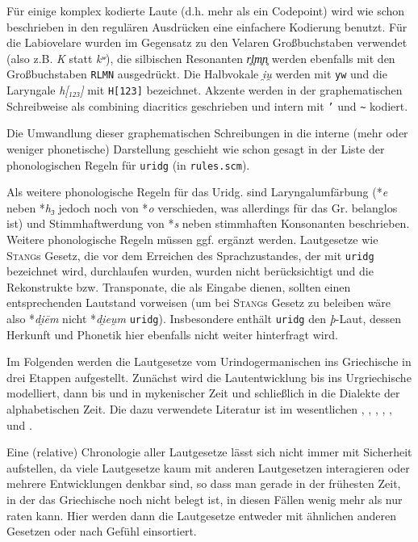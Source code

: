 \documentclass[12pt,a4paper,normalheadings]{scrartcl}
\def\rek#1{\mbox{*\textit{#1}}}
\def\bel#1{\mbox{\textit{#1}}}
\def\tt#1{\texttt{#1}}
\begin{document}
Für einige komplex kodierte Laute (d.h. mehr als ein Codepoint)
wird wie schon beschrieben in den regulären Ausdrücken eine einfachere
Kodierung benutzt.
Für die Labiovelare wurden im Gegensatz zu den Velaren Großbuchstaben verwendet
(also z.B. \bel{K} statt \bel{kʷ}),
die silbischen Resonanten \bel{r̥l̥m̥n̥} werden ebenfalls
mit den Großbuchstaben \tt{RLMN} ausgedrückt.
Die Halbvokale \bel{i̯u̯} werden mit \tt{yw} und
die Laryngale \bel{h[₁₂₃]} mit \tt{H[123]} bezeichnet.
Akzente werden in der graphematischen Schreibweise
als combining diacritics geschrieben und intern mit \tt{'} und \tt{\textasciitilde}
kodiert.

Die Umwandlung dieser graphematischen Schreibungen in die interne
(mehr oder weniger phonetische) Darstellung geschieht wie schon
gesagt in der Liste der
phonologischen Regeln für \tt{uridg} (in \tt{rules.scm}).

Als weitere phonologische Regeln für das Uridg.
sind Laryngalumfärbung (\rek{e} neben \rek{h₃} jedoch noch von \rek{o}
verschieden, was allerdings für das Gr. belanglos ist)
und Stimmhaftwerdung von \rek{s} neben stimmhaften Konsonanten beschrieben.
Weitere phonologische Regeln müssen ggf. ergänzt werden.
Lautgesetze wie \textsc{Stang}s Gesetz,
die vor dem Erreichen des Sprachzustandes, der mit \tt{uridg} bezeichnet wird,
durchlaufen wurden,
wurden nicht berücksichtigt und die Rekonstrukte bzw. Transponate,
die als Eingabe dienen, sollten einen entsprechenden Lautstand vorweisen
(um bei \textsc{Stang}s Gesetz zu beleiben wäre also \rek{di̯ēm} nicht \rek{di̯eu̯m} \tt{uridg}).
Insbesondere enthält \tt{uridg} den \textit{þ}-Laut,
dessen Herkunft und Phonetik hier ebenfalls nicht weiter hinterfragt wird.

Im Folgenden werden die Lautgesetze vom Urindogermanischen ins Griechische
in drei Etappen aufgestellt.
Zunächst wird die Lautentwicklung bis ins Urgriechische modelliert,
dann bis und in mykenischer Zeit und schließlich in die Dialekte
der alphabetischen Zeit.
Die dazu verwendete Literatur ist im wesentlichen
\cite{bart_langvok},
\cite{bart_frueh},
\cite{bart_hand},
\cite{buck},
\cite{lejeune},
\cite{rix} und
\cite{sihler}.

Eine (relative) Chronologie aller Lautgesetze lässt sich nicht immer
mit Sicherheit aufstellen,
da viele Lautgesetze kaum mit anderen Lautgesetzen interagieren
oder mehrere Entwicklungen denkbar sind,
so dass man gerade in der frühesten Zeit,
in der das Griechische noch nicht belegt ist,
in diesen Fällen wenig mehr als nur raten kann.
Hier werden dann die Lautgesetze entweder mit ähnlichen
anderen Gesetzen oder nach Gefühl einsortiert.
\end{document}
